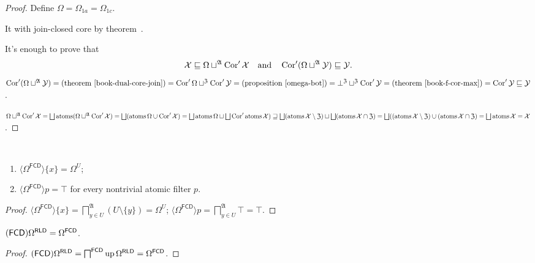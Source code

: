 \begin{proof}
Define $\Omega = \Omega_{1a} = \Omega_{1c}$.

It with join-closed core by theorem~.

It's enough to prove that
\[
\mathcal{X}\sqsubseteq\Omega\sqcup^{\mathfrak{A}}\operatorname{Cor}'\mathcal{X}\quad\text{and}\quad\operatorname{Cor}'(\Omega\sqcup^{\mathfrak{A}}\mathcal{Y})\sqsubseteq\mathcal{Y}.
\]
$\Cor'(\Omega\sqcup^{\mathfrak{A}}\mathcal{Y}) =
\text{(theorem~\bookref{dual-core-join})} =
\Cor'\Omega\sqcup^{\mathfrak{Z}}\Cor'\mathcal{Y} =
\text{(proposition~\ref{omega-bot})} =
\bot^{\mathfrak{Z}}\sqcup^{\mathfrak{Z}}\Cor'\mathcal{Y} =
\text{(theorem~\bookref{f-cor-max})} =
\Cor'\mathcal{Y}\sqsubseteq\mathcal{Y}$.

$\Omega\sqcup^{\mathfrak{A}}\Cor'\mathcal{X} =
\bigsqcup\atoms(\Omega\sqcup^{\mathfrak{A}}\Cor'\mathcal{X}) =
\bigsqcup(\atoms\Omega\cup\Cor'\mathcal{X}) =
\bigsqcup\atoms\Omega\sqcup\bigsqcup\Cor'\atoms\mathcal{X}) \sqsupseteq
\bigsqcup(\atoms\mathcal{X}\setminus\mathfrak{Z}) \sqcup
\bigsqcup(\atoms\mathcal{X}\cap\mathfrak{Z}) =
\bigsqcup((\atoms\mathcal{X}\setminus\mathfrak{Z}) \cup
(\atoms\mathcal{X}\cap\mathfrak{Z}) =
\bigsqcup\atoms\mathcal{X} = \mathcal{X}$.
\end{proof}

\begin{prop}
  ~  
  \begin{enumerate}
    \item $\langle \Omega^{\mathsf{FCD}} \rangle \{ x \} = \Omega^U$;
    
    \item $\langle \Omega^{\mathsf{FCD}} \rangle p = \top$ for every
    nontrivial atomic filter $p$.
  \end{enumerate}
\end{prop}

\begin{proof}
  $\langle \Omega^{\mathsf{FCD}} \rangle \{ x \} =
  \bigsqcap^{\mathfrak{A}}_{y \in U} (U \setminus \{ y \}) = \Omega^U$;
  $\langle \Omega^{\mathsf{FCD}} \rangle p = \bigsqcap^{\mathfrak{A}}_{y
  \in U} \top = \top$.
\end{proof}

\begin{prop}
  $(\mathsf{FCD}) \Omega^{\mathsf{RLD}} =
  \Omega^{\mathsf{FCD}}$.
\end{prop}

\begin{proof}
  $(\mathsf{FCD}) \Omega^{\mathsf{RLD}} =
  \bigsqcap^{\mathsf{FCD}} \operatorname{up} \Omega^{\mathsf{RLD}} =
  \Omega^{\mathsf{FCD}}$.
\end{proof}

